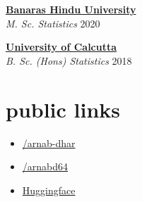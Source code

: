 \documentclass[12pt]{article}
\newcommand{\entry}[4]{{{\textbf{#1}}} \hfill #3 \\ #2 \hfill #4}
\begin{document}
\begin{paracol}{2}
\begin{flushleft}
\entry{\href{https://www.bhu.ac.in/Site/Home/1_2_16_Main-Site}{Banaras Hindu University}}{\emph{M. Sc. Statistics}}{}{2020}
\medskip

\entry{\href{https://caluniv.ac.in/}{University of Calcutta}}{\emph{B. Sc. (Hons) Statistics}}{}{2018}

\end{flushleft}

\section{public links}

\begin{itemize}[itemsep=1pt]
  \item[\faLinkedin] \href{https://www.linkedin.com/in/arnab-dhar}{/arnab-dhar}
  \item[\faGithub] \href{https://www.github.com/arnabd64}{/arnabd64} 
  \item[\faLink] \href{https://hf.co/arnabdhar}{Huggingface} 
\end{itemize}


\end{paracol}
\end{document}
